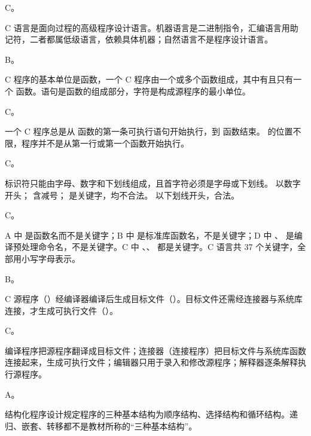 \documentclass[a4paper,11pt]{article}
\begin{document}


\q C。\begin{analysis}C 语言是面向过程的高级程序设计语言。机器语言是二进制指令，汇编语言用助记符，二者都属低级语言，依赖具体机器；自然语言不是程序设计语言。\end{analysis}

\q B。\begin{analysis}C 程序的基本单位是函数，一个 C 程序由一个或多个函数组成，其中有且只有一个  函数。语句是函数的组成部分，字符是构成源程序的最小单位。\end{analysis}

\q C。\begin{analysis}一个 C 程序总是从  函数的第一条可执行语句开始执行，到  函数结束。 的位置不限，程序并不是从第一行或第一个函数开始执行。\end{analysis}

\q C。\begin{analysis}标识符只能由字母、数字和下划线组成，且首字符必须是字母或下划线。 以数字开头； 含减号； 是关键字，均不合法。 以下划线开头，合法。\end{analysis}

\q C。\begin{analysis}A 中  是函数名而不是关键字；B 中  是标准库函数名，不是关键字；D 中 、 是编译预处理命令名，不是关键字。C 中 、、 都是关键字。C 语言共 37 个关键字，全部用小写字母表示。\end{analysis}

\q B。\begin{analysis}C 源程序（）经编译器编译后生成目标文件（）。目标文件还需经连接器与系统库连接，才生成可执行文件（）。\end{analysis}

\q C。\begin{analysis}编译程序把源程序翻译成目标文件；连接器（连接程序）把目标文件与系统库函数连接起来，生成可执行文件；编辑器只用于录入和修改源程序；解释器逐条解释执行源程序。\end{analysis}

\q A。\begin{analysis}结构化程序设计规定程序的三种基本结构为顺序结构、选择结构和循环结构。递归、嵌套、转移都不是教材所称的“三种基本结构”。\end{analysis}
\end{document}
